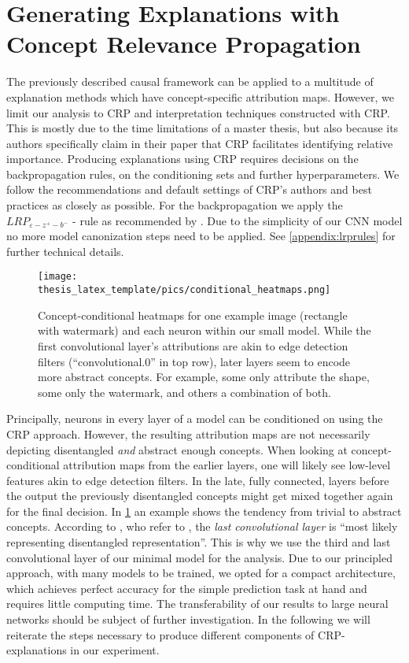 \section{Generating Explanations with Concept Relevance Propagation}\label{section:explanations_with_crp}
The previously described causal framework can be applied to a multitude of explanation methods which have concept-specific attribution maps. However, we limit our analysis to CRP and interpretation techniques constructed with CRP. This is mostly due to the time limitations of a master thesis, but also because its authors specifically claim in their paper that CRP facilitates identifying relative importance. 
Producing explanations using CRP requires decisions on the backpropagation rules, on the conditioning sets and further hyperparameters. 
We follow the recommendations and default settings of CRP's authors \citep{Achtibat2022, Achtibat2023} and best practices \citep{Kohlbrenner2020} as closely as possible.
For the backpropagation we apply the $LRP_{\varepsilon -z^+- b^-}$ - rule as recommended by \cite{Kohlbrenner2020}. Due to the simplicity of our CNN model no more model canonization steps need to be applied. See \cref{appendix:lrprules} for further technical details. 

\begin{figure}[t!]
    \centering
    \texttt{[image: thesis\_latex\_template/pics/conditional\_heatmaps.png]}
    \caption[Comparing Attribution Maps of Layers]{Concept-conditional heatmaps for one example image (rectangle with watermark) and each neuron within our small model. While the first convolutional layer's attributions are akin to edge detection filters (``convolutional.0'' in top row), later layers seem to encode more abstract concepts. For example, some only attribute the shape, some only the watermark, and others a combination of both.}
    \label{fig:cc_heatmaps}
\end{figure}

Principally, neurons in every layer of a model can be conditioned on using the CRP approach. However, the resulting attribution maps are not necessarily depicting disentangled \textit{and} abstract enough concepts. When looking at concept-conditional attribution maps from the earlier layers, one will likely see low-level features akin to edge detection filters. In the late, fully connected, layers before the output the previously disentangled concepts might get mixed together again for the final decision. In \cref{fig:cc_heatmaps} an example shows the tendency from trivial to abstract concepts. 
According to \cite{Dreyer2023a}, who refer to \cite{Zeiler2013}, the \textit{last convolutional layer} is ``most likely representing disentangled representation''. This is why we use the third and last convolutional layer of our minimal model for the analysis.  
Due to our principled approach, with many models to be trained, we opted for a compact architecture, which achieves perfect accuracy for the simple prediction task at hand and requires little computing time. The transferability of our results to large neural networks should be subject of further investigation.
In the following we will reiterate the steps necessary to produce different components of CRP-explanations in our experiment.

